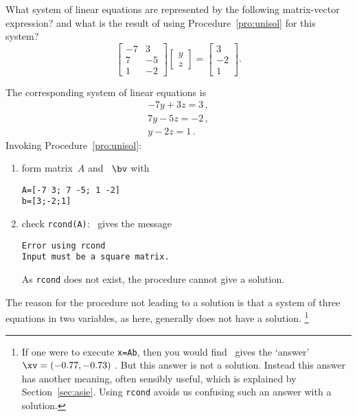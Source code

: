 \begin{example} \label{eg:}
What system of linear equations are represented by the following matrix-vector expression?  and what is the result of using Procedure~\ref{pro:unisol} for this system?
\begin{equation*}
\begin{bmatrix} -7&3\\ 7&-5\\1&-2 \end{bmatrix}
\begin{bmatrix} y\\z \end{bmatrix}
=\begin{bmatrix} 3\\-2\\1 \end{bmatrix}.
\end{equation*}

\begin{solution} 
The corresponding system of linear equations is
\begin{equation*}
\begin{array}{l}
-7y+3z=3\,,\\7y-5z=-2\,,\\y-2z=1\,.
\end{array}
\end{equation*}
Invoking Procedure~\ref{pro:unisol}:
\begin{enumerate}
\item form matrix~\(A\) and ~\(\bv\) with
\begin{verbatim}
A=[-7 3; 7 -5; 1 -2]
b=[3;-2;1]
\end{verbatim}
\setbox\ajrqrbox\hbox{}%
\marginpar{\usebox{\ajrqrbox\\[2ex]}}%

\item check \verb|rcond(A)|: \script\ gives the message
\begin{verbatim}
Error using rcond
Input must be a square matrix. 
\end{verbatim}
As \verb|rcond| does not exist, the procedure cannot give a solution.
\end{enumerate}
The reason for the procedure not leading to a solution is that a system of three equations in two variables, as here, generally does not have a solution.
\footnote{If one were to execute \texttt{x=A\slosh b}, then you would find \script\ gives the `answer' \(\xv=(-0.77,-0.73)\) \twodp.
But this answer is not a solution.
Instead this answer has another meaning, often sensibly useful, which is explained by Section~\ref{sec:asie}.
Using \texttt{rcond} avoids us confusing such an answer with a solution.}
\end{solution}
\end{example}




